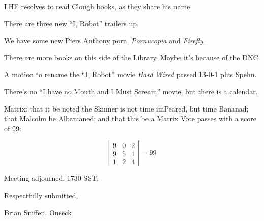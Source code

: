 \documentclass[10pt]{article}
\newcommand{\ps}{ plus Spehn\xspace}
\begin{document}
LHE resolves to read Clough books, as they share his name

There are three new ``I, Robot'' trailers up.

We have some new Piers Anthony porn, \emph{Pornucopia} and
\emph{Firefly}.

There are more books on this side of the Library.  Maybe it's because
of the DNC.

A motion to rename the ``I, Robot'' movie \emph{Hard Wired} passed 13-0-1\ps.

There's no ``I have no Mouth and I Must Scream'' movie, but there is a
calendar.

Matrix: that it be noted the Skinner is not time imPeared, but time
Bananad; that Malcolm be Albanianed; and that this be a Matrix Vote 
passes with a score of 99:

\[
\left|
\begin{array}{ccc}
9 & 0 & 2 \\
9 & 5 & 1 \\
1 & 2 & 4
\end{array}
\right| = 99
\]

\vspace{12pt}

\noindent
Meeting adjourned, 1730 SST.

\vspace{18pt}

\centerline{Respectfully submitted,}
\centerline{Brian Sniffen, Onseck}
\end{document}
